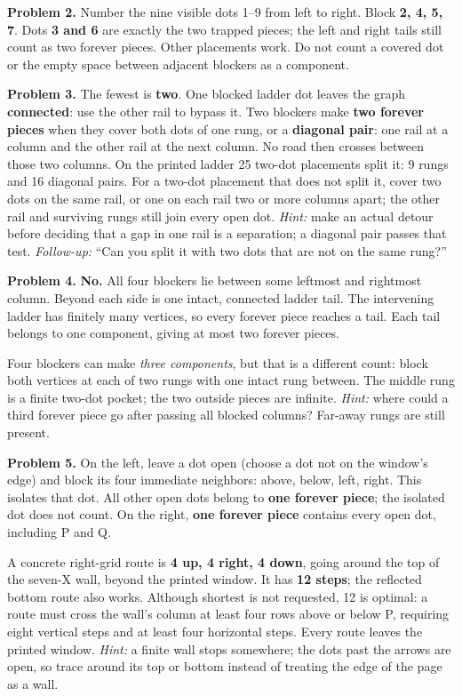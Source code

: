\documentclass[11pt,letterpaper]{article}
\newcommand{\heading}[1]{\par\vspace{5pt}{\large\bfseries #1}\par}
\begin{document}
\textbf{Problem 2.} Number the nine visible dots 1--9 from left to right. Block \textbf{2, 4, 5, 7}. Dots \textbf{3 and 6} are exactly the two trapped pieces; the left and right tails still count as two forever pieces. Other placements work. Do not count a covered dot or the empty space between adjacent blockers as a component.
\heading{Answers continued and the reasons they hold}
\textbf{Problem 3.} The fewest is \textbf{two}. One blocked ladder dot leaves the graph \textbf{connected}: use the other rail to bypass it. Two blockers make \textbf{two forever pieces} when they cover both dots of one rung, or a \textbf{diagonal pair}: one rail at a column and the other rail at the next column. No road then crosses between those two columns. On the printed ladder 25 two-dot placements split it: 9 rungs and 16 diagonal pairs. For a two-dot placement that does not split it, cover two dots on the same rail, or one on each rail two or more columns apart; the other rail and surviving rungs still join every open dot. \emph{Hint:} make an actual detour before deciding that a gap in one rail is a separation; a diagonal pair passes that test. \emph{Follow-up:} ``Can you split it with two dots that are not on the same rung?''

\textbf{Problem 4.} \textbf{No.} All four blockers lie between some leftmost and rightmost column. Beyond each side is one intact, connected ladder tail. The intervening ladder has finitely many vertices, so every forever piece reaches a tail. Each tail belongs to one component, giving at most two forever pieces.

Four blockers can make \emph{three components}, but that is a different count: block both vertices at each of two rungs with one intact rung between. The middle rung is a finite two-dot pocket; the two outside pieces are infinite. \emph{Hint:} where could a third forever piece go after passing all blocked columns? Far-away rungs are still present.

\textbf{Problem 5.} On the left, leave a dot open (choose a dot not on the window's edge) and block its four immediate neighbors: above, below, left, right. This isolates that dot. All other open dots belong to \textbf{one forever piece}; the isolated dot does not count. On the right, \textbf{one forever piece} contains every open dot, including P and Q.

A concrete right-grid route is \textbf{4 up, 4 right, 4 down}, going around the top of the seven-X wall, beyond the printed window. It has \textbf{12 steps}; the reflected bottom route also works. Although shortest is not requested, 12 is optimal: a route must cross the wall's column at least four rows above or below P, requiring eight vertical steps and at least four horizontal steps. Every route leaves the printed window. \emph{Hint:} a finite wall stops somewhere; the dots past the arrows are open, so trace around its top or bottom instead of treating the edge of the page as a wall.
\end{document}
